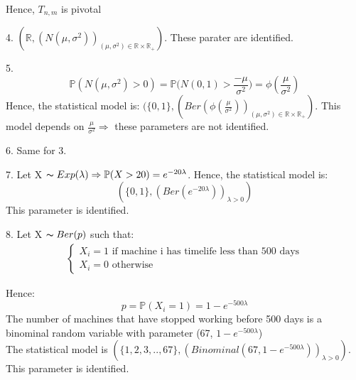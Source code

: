 \documentclass[10pt]{article}
\newenvironment{problem}[2][Problem]{\begin{trivlist}
\item[\hskip \labelsep {\bfseries #1}\hskip \labelsep {\bfseries #2.}]}{\end{trivlist}}
\begin{document}
\begin{problem}{2}
Hence, $T_{n,m}$ is pivotal
\item 4.
$(\mathbb{R}, (N(\mu, \sigma^2))_{(\mu, \sigma^2) \in \mathbb{R} \times \mathbb{R_+}})$. These parater are identified.
\item 5.
\[\mathbb{P}(N(\mu, \sigma^2)>0)=\mathbb{P}\Big( N(0,1) > \frac{-\mu}{\sigma^2} \Big)=\phi(\frac{\mu}{\sigma^2})\]
Hence, the statistical model is: $(\{0,1\}, (Ber(\phi(\frac{\mu}{\sigma^2}))_{(\mu, \sigma^2) \in \mathbb{R} \times \mathbb{R_+}})$. This model depends on $\frac{\mu}{\sigma^2} \Rightarrow$ these parameters are not identified.
\item 6.
Same for 3.
\item 7.
Let X $\thicksim Exp(\lambda) \Rightarrow \mathbb{P}(X>20)=e^{-20\lambda}$. Hence, the statistical model is:
\[(\{ 0,1\},(Ber(e^{-20\lambda}))_{\lambda>0}) \] 
This parameter is identified.

\item 8.
Let X $\thicksim Ber(p)$ such that:
\begin{align}
    \begin{cases}
        X_{i}=1 \text{ if machine i has timelife less than 500 days} \\
        X_{i}=0 \text{ otherwise}
    \end{cases}
\end{align}

Hence: 
\[p=\mathbb{P}(X_{i}=1)=1-e^{-500\lambda}\]
The number of machines that have stopped working before 500 days is a binominal random variable with parameter (67, $1-e^{-500\lambda}$)\\
The statistical model is $(\{1,2,3,..,67 \}, (Binominal(67, 1-e^{-500\lambda}))_{\lambda>0})$. This parameter is identified.

\end{problem}
\end{document}
